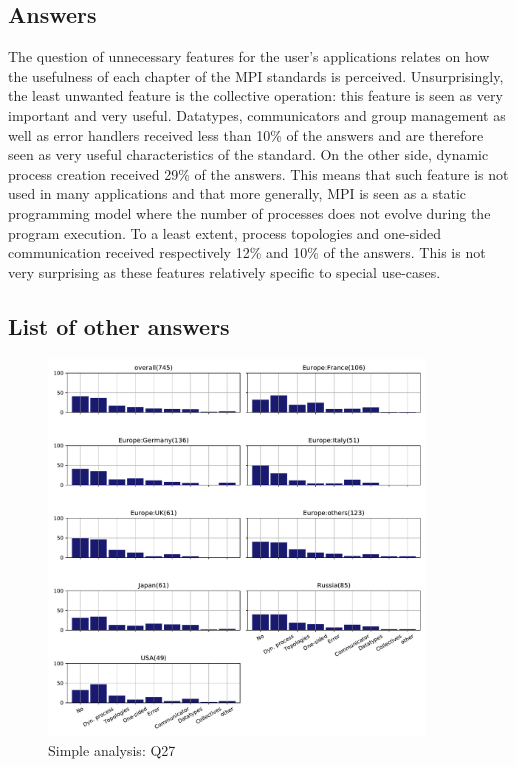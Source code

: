 
\subsection{Answers}


The question of unnecessary features for the user’s applications relates on how
the usefulness of each chapter of the MPI standards is perceived. Unsurprisingly, the
least unwanted feature is the collective operation: this feature is seen as
very important and very useful. Datatypes, communicators and group management
as well as  error handlers received less than 10\% of the answers and are
therefore seen as very useful characteristics of the standard. On the other
side, dynamic process creation received 29\% of the answers. This means that
such feature is not used in many applications and that more generally, MPI is seen
as a static programming model where the number of processes does not evolve
during the program execution. To a least extent, process topologies and
one-sided communication received respectively 12\% and 10\% of the answers. This
is not very surprising as these features relatively specific to special
use-cases. 

\subsection{List of other answers}
\begin{itemize}

\end{itemize}

\begin{figure}[htb]
\begin{center}
\includegraphics[width=10cm]{../pdfs/Q27.pdf}
\caption{Simple analysis: Q27}
\label{fig:Q27}
\end{center}
\end{figure}

